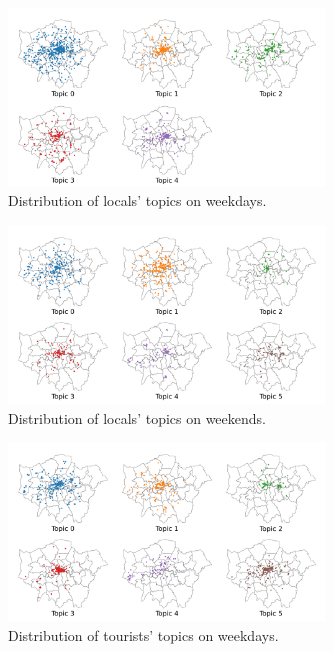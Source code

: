\documentclass{article}
\theoremstyle{definition}
\theoremstyle{remark}
\begin{document}
\begin{figure}[!h]
\centering
\includegraphics[width=0.75\textwidth]{figures/topics_distribution_weekday_locals.png}
\caption{\label{fig:topics_distribution_weekday_locals}Distribution of locals' topics on weekdays.}
\end{figure}

\begin{figure}[!h]
\centering
\includegraphics[width=0.75\textwidth]{figures/topics_distribution_weekend_locals.png}
\caption{\label{fig:topics_distribution_weekend_locals}Distribution of locals' topics on weekends.}
\end{figure}

\begin{figure}[!h]
\centering
\includegraphics[width=0.75\textwidth]{figures/topics_distribution_weekday_tourists.png}
\caption{\label{fig:topics_distribution_weekday_tourists}Distribution of tourists' topics on weekdays.}
\end{figure}
\end{document}
